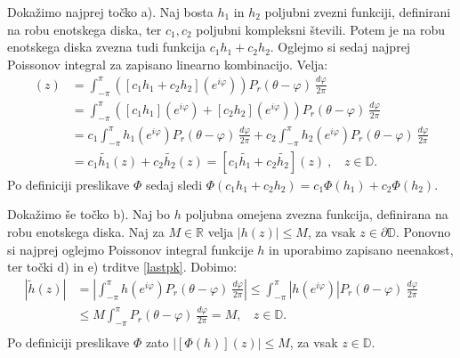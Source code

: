 \documentclass[mat1]{fmfdelo}
\begin{document}
     \begin{dokaz}
            Dokažimo najprej točko a). Naj bosta $h_1$ in $h_2$ poljubni zvezni funkciji, definirani na robu enotskega diska, ter $c_1, c_2$ poljubni kompleksni števili. 
            Potem je na robu enotskega diska zvezna tudi funkcija $c_1 h_1 + c_2 h_2$. Oglejmo si sedaj najprej Poissonov integral za zapisano linearno kombinacijo. Velja:
            \begin{align*}
                [\widetilde{c_1 h_1 + c_2 h_2}](z) &= \int_{-\pi}^{\pi}{\left([c_1 h_1 + c_2 h_2](e^{i\varphi}) \right)P_r(\theta - \varphi)~\frac{d\varphi}{2 \pi}}\\ 
                & = \int_{-\pi}^{\pi}{\left([c_1 h_1](e^{i\varphi}) + [c_2 h_2](e^{i\varphi})\right)P_r(\theta - \varphi)~\frac{d\varphi}{2 \pi}}\\
                & = c_1\int_{-\pi}^{\pi}{h_1(e^{i\varphi})P_r(\theta - \varphi)~\frac{d\varphi}{2 \pi}} + c_2\int_{-\pi}^{\pi}{h_2(e^{i\varphi})P_r(\theta - \varphi)~\frac{d\varphi}{2 \pi}}\\
                & = c_1 \widetilde{h_1}(z) + c_2 \widetilde{h_2}(z) = [c_1 \widetilde{h_1} + c_2 \widetilde{h_2}](z)~,~~~~z \in \mathbb{D}.
            \end{align*}
            Po definiciji preslikave $\Phi$ sedaj sledi $\Phi(c_1 h_1 + c_2 h_2) = c_1 \Phi(h_1) + c_2 \Phi(h_2)$.

            Dokažimo še točko b). Naj bo $h$ poljubna omejena zvezna funkcija, definirana na robu enotskega diska. Naj za $M \in \mathbb{R}$ velja $|h(z)| \leq M$, za vsak $z \in \partial \mathbb{D}$.
            Ponovno si najprej oglejmo Poissonov integral funkcije $h$ in uporabimo zapisano neenakost, ter točki d) in e) trditve \ref{lastpk}. Dobimo:
            \begin{align*}
                \left|\widetilde{h}(z)\right| &= \left| \int_{-\pi}^{\pi}{h(e^{i\varphi}) P_r(\theta - \varphi)~\frac{d\varphi}{2 \pi}} \right| \leq \int_{-\pi}^{\pi}{\left|h(e^{i\varphi}) \right|P_r(\theta - \varphi)~\frac{d\varphi}{2 \pi}} \\ 
                &\leq M \int_{-\pi}^{\pi}{P_r(\theta - \varphi)~\frac{d\varphi}{2 \pi}} = M,~~~~z \in \mathbb{D}.& & \\
            \end{align*}
            Po definiciji preslikave $\Phi$ zato $|[\Phi(h)](z)| \leq M$, za vsak $z \in \mathbb{D}$.
     \end{dokaz}
\end{document}
